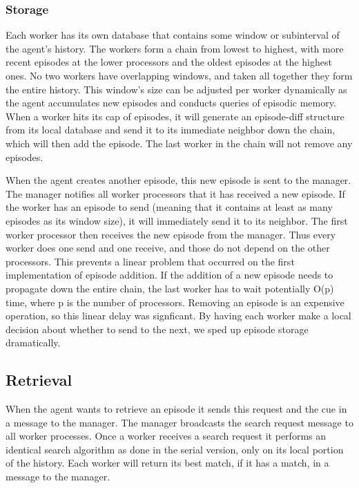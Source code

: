 \documentclass[11pt]{article} %
\begin{document}
\subsubsection{Storage}

Each worker has its own database that contains some window or subinterval of the agent's history. 
The workers form a chain from lowest to highest, with more recent episodes at the 
lower processors and the oldest episodes at the highest ones. No two workers have
overlapping windows, and taken all together they form the entire history. 
This window's size can be adjusted per worker dynamically as
the agent accumulates new episodes and conducts queries of episodic memory. 
When a worker hits its cap of episodes, it will generate an episode-diff structure
from its local database and send it to its immediate neighbor down the chain, 
which will then add the episode. The last worker in the chain will not remove any episodes. 

When the agent creates another episode, this new episode is sent to the
manager. The manager notifies all worker processors that it has received a new
episode. If the worker has an episode to send (meaning that it contains at least
as many episodes as its window size), it will immediately send it to its neighbor. 
The first worker processor then receives the new episode from the manager. 
Thus every worker does one send and one receive, and those do not depend
on the other processors. This prevents a linear problem that occurred on the
first implementation of episode addition. If the addition of a new episode needs
to propagate down the entire chain, the last worker has to wait potentially O(p) time, 
where p is the number of processors. Removing an episode is an expensive operation, 
so this linear delay was signficant. By having each worker make a local decision
about whether to send to the next, we sped up episode storage dramatically. 


\subsection{Retrieval}
When the agent wants to retrieve an episode it sends this request and the cue in
a message to the manager. The manager broadcasts the search request message to
all worker processes. Once a worker receives a search request it performs an
identical search algorithm as done in the serial version, only on its local portion
of the history. Each worker will return its best match, if it
has a match, in a message to the manager.
\end{document}
